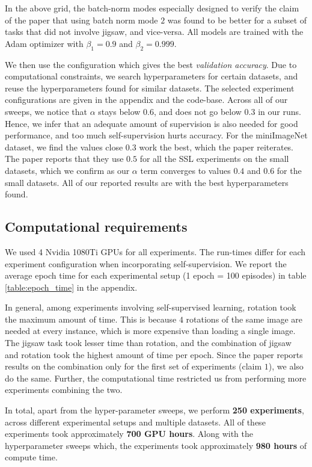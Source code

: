 In the above grid, the batch-norm modes especially designed to verify the claim of the paper that using batch norm mode $2$ was found to be better for a subset of tasks that did not involve jigsaw, and vice-versa. All models are trained with the Adam optimizer with $\beta_1 = 0.9$ and $\beta_2 = 0.999$.

We then use the configuration which gives the best \textit{validation accuracy}. Due to computational constraints, we search hyperparameters for certain datasets, and reuse the hyperparameters found for similar datasets. The selected experiment configurations are given in the appendix and the code-base. Across all of our sweeps, we notice that $\alpha$ stays below $0.6$, and does not go below $0.3$ in our runs. Hence, we infer that an adequate amount of supervision is also needed for good performance, and too much self-supervision hurts accuracy. For the miniImageNet dataset, we find the values close $0.3$ work the best, which the paper reiterates. The paper reports that they use $0.5$ for all the SSL experiments on the small datasets, which we confirm as our $\alpha$ term converges to values $0.4$ and $0.6$ for the small datasets. All of our reported results are with the best hyperparameters found.

\subsection{Computational requirements}
\label{ss:comp_req}

We used 4 Nvidia 1080Ti GPUs for all experiments. The run-times differ for each experiment configuration when incorporating self-supervision. We report the average epoch time for each experimental setup (1 epoch = 100 episodes) in table \ref{table:epoch_time} in the appendix.  

In general, among experiments involving self-supervised learning, rotation took the maximum amount of time. This is because $4$ rotations of the same image are needed at every instance, which is more expensive than loading a single image. The jigsaw task took lesser time than rotation, and the combination of jigsaw and rotation took the highest amount of time per epoch. Since the paper reports results on the combination only for the first set of experiments (claim $1$), we also do the same. Further, the computational time restricted us from performing more experiments combining the two.

In total, apart from the hyper-parameter sweeps, we perform \textbf{250 experiments}, across different experimental setups and multiple datasets. All of these experiments took approximately \textbf{700 GPU hours}. Along with the hyperparameter sweeps which, the experiments took approximately \textbf{980 hours} of compute time. 

